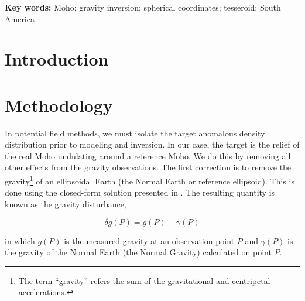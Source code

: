 \documentclass[extra]{gji}
\title[]{\Title}
\author[]{
    Leonardo Uieda$^{1,2}$,
    Valéria C. F. Barbosa$^{2}$
    \\
    $^1$Universidade do Estado do Rio de Janeiro, Rio de Janeiro, Brazil.
    e-mail: leo@leouieda.com
    \\
    $^2$Observatório Nacional, Rio de Janeiro, Brazil.
}
\newcommand{\Keywords}{
        Moho;
        gravity inversion;
        spherical coordinates;
        tesseroid;
        South America
}
\begin{document}
\maketitle


\begin{abstract}
\end{abstract}

\noindent\textbf{Key words:} \Keywords


\section{Introduction}


\section{Methodology}

In potential field methods,
we must isolate the target anomalous density distribution prior to modeling and
inversion.
In our case, the target is the relief of the real Moho undulating around a
reference Moho.
We do this by removing all other effects from the gravity observations.
The first correction is to remove the
gravity\footnote{The term ``gravity'' refers the sum of the gravitational and
centripetal accelerations.}
of an ellipsoidal Earth (the Normal Earth or reference ellipsoid).
This is done using the closed-form solution presented in \citet{li_ellipsoid_2001}.
The resulting quantity is known as the gravity disturbance,

\begin{equation}
    \delta g(P) = g(P) - \gamma(P)
\end{equation}

\noindent in which $g(P)$ is the measured gravity at an observation point $P$
and $\gamma(P)$ is the gravity of the Normal Earth (the Normal Gravity)
calculated on point $P$.
\end{document}
